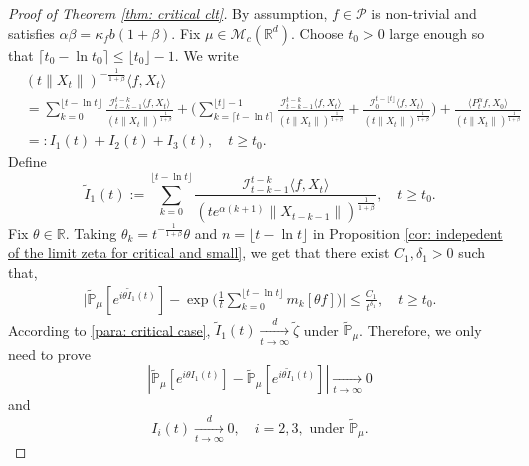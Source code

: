 \documentclass[12pt,a4paper]{amsart}
\theoremstyle{plain}
\theoremstyle{definition}
\numberwithin{equation}{section}
\begin{document}
\begin{proof}[Proof of Theorem \ref{thm: critical clt}]
  By assumption, $f\in\mathcal{P}$ is non-trivial and satisfies $\alpha\beta=\kappa_fb(1+\beta)$.
  Fix $\mu \in \mathcal M_c(\mathbb R^d)$.
  Choose $t_0 > 0$ large enough so that $\lceil t_0-\ln t_0\rceil \leq \lfloor t_0 \rfloor - 1.$
  We write
  \begin{align}
    &(t\|X_t\|)^{-\frac{1}{1+\beta}} \langle f,X_t \rangle \\
    & = \sum_{k=0}^{\lfloor t-\ln t \rfloor} \frac {\mathcal I_{t-k-1}^{t-k}\langle f ,X_t\rangle} {(t\|X_t\|)^{\frac{1}{1+\beta}}} + \Big( \sum_{k=\lceil t-\ln t \rceil}^{\lfloor t \rfloor-1} \frac {\mathcal I_{t-k-1}^{t-k} \langle f, X_t\rangle} {(t\|X_t\|)^{\frac{1}{1+\beta}}} + \frac {\mathcal I_0^{t-\lfloor t \rfloor}\langle f ,X_t\rangle} {(t\|X_t\|)^{\frac{1}{1+\beta}}} \Big) + \frac {\langle P^\alpha_tf,X_0\rangle} { ( t \| X_t \| )^{ \frac { 1 } { 1 + \beta } } } \\ 
    & =: I_1(t) + I_2(t) + I_3(t),
      \quad t\geq t_0.
  \end{align}
  Define
  \[
    \widetilde I_1(t)
    := \sum_{k=0}^{\lfloor t-\ln t \rfloor} \frac{\mathcal I_{t-k-1}^{t-k} \langle f ,X_t\rangle} {(t e^{\alpha(k+1)}\|X_{t-k-1}\|)^{\frac{1}{1+\beta}} },
    \quad t\geq t_0.
  \]
  Fix $\theta\in \mathbb R$.
  Taking $\theta_k=t ^{-\frac{1}{1+\beta}} \theta $ and $n={\lfloor t-\ln t \rfloor}$ in Proposition \ref{cor: indepedent of the limit zeta for critical and small}, we get that there exist $C_1,\delta_1>0$ such that,
  \begin{align}
    \Big| \mathbb{\widetilde{P}}_{\mu}  [ e^{ i  \theta \widetilde{I}_1(t) } ] - \exp \Big( \frac { 1 } { t } \sum_{k=0}^{\lfloor t - \ln t \rfloor} m_k [ \theta f ] \Big) \Big| 
    \leq \frac{C_1}{t^{\delta_1}},
    \quad t\geq t_0.
  \end{align}
  According to \eqref{para: critical case},  $\widetilde{I}_1(t)\xrightarrow[t\to \infty]{d}\widetilde \zeta$ under $\widetilde {\mathbb P}_\mu$.
  Therefore, we only need to prove
  \begin{equation}
    \label{toprove-1}
    |\mathbb{\widetilde{P}}_{\mu}[e^{i\theta I_1(t)}]-\mathbb{\widetilde{P}}_{\mu}[e^{i\theta\widetilde{I}_1(t)}]|
    \xrightarrow[t\to \infty]{} 0
  \end{equation}
  and
  \begin{equation}
    \label{toprove-2}
    I_i(t)\xrightarrow[t\to \infty]{d} 0,
    \quad i = 2,3,
    \mbox{ under } \widetilde {\mathbb P}_\mu.
  \end{equation}


\end{proof}
\end{document}
